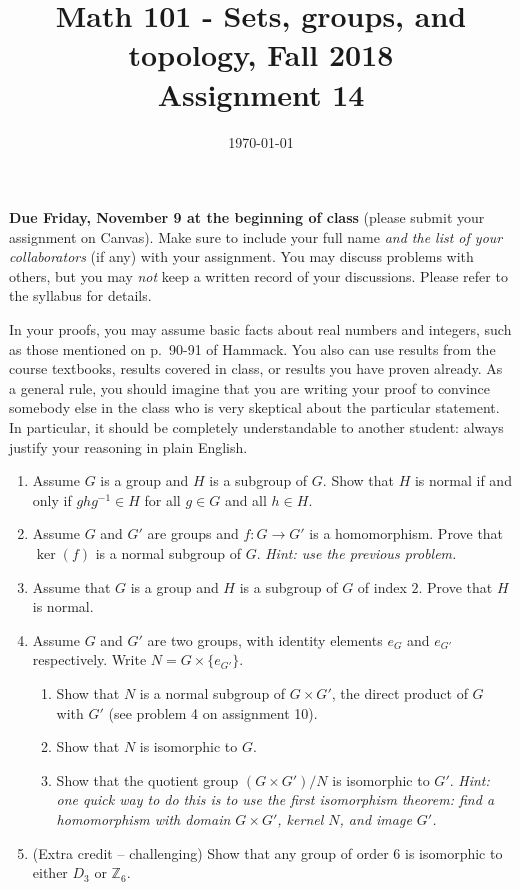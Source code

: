 \documentclass{amsart}
\title[Math 101, Fall 2018: assignment 14]{Math 101 - Sets, groups, and topology, Fall 2018 \\ Assignment 14}
\date{\today}
\theoremstyle{definition}
\begin{document}

\maketitle

\textbf{Due Friday, November 9 at the beginning of class} (please submit your assignment on Canvas). Make sure to include your full name \emph{and the list of your collaborators} (if any) with your assignment. You may discuss problems with others, but you may \emph{not} keep a written record of your discussions. Please refer to the syllabus for details.

In your proofs, you may assume basic facts about real numbers and integers, such as those mentioned on p.~90-91 of Hammack. You also can use results from the course textbooks, results covered in class, or results you have proven already. As a general rule, you should imagine that you are writing your proof to convince somebody else in the class who is very skeptical about the particular statement. In particular, it should be completely understandable to another student: always justify your reasoning in plain English. 

\begin{enumerate}
\item Assume $G$ is a group and $H$ is a subgroup of $G$. Show that $H$ is normal if and only if $ghg^{-1} \in H$ for all $g \in G$ and all $h \in H$.
\item Assume $G$ and $G'$ are groups and $f: G \to G'$ is a homomorphism. Prove that $\ker (f)$ is a normal subgroup of $G$. \emph{Hint: use the previous problem.}
\item Assume that $G$ is a group and $H$ is a subgroup of $G$ of index $2$. Prove that $H$ is normal.
\item Assume $G$ and $G'$ are two groups, with identity elements $e_G$ and $e_{G'}$ respectively. Write $N = G \times \{e_{G'}\}$.
  \begin{enumerate}
  \item Show that $N$ is a normal subgroup of $G \times G'$, the direct product of $G$ with $G'$ (see problem 4 on assignment 10).
  \item Show that $N$ is isomorphic to $G$.
  \item Show that the quotient group $(G \times G') / N$ is isomorphic to $G'$. \emph{Hint: one quick way to do this is to use the first isomorphism theorem: find a homomorphism with domain $G \times G'$, kernel $N$, and image $G'$.}
  \end{enumerate}
\item (Extra credit -- challenging) Show that any group of order 6 is isomorphic to either $D_3$ or $\mathbb{Z}_6$.
\end{enumerate}



\end{document}
